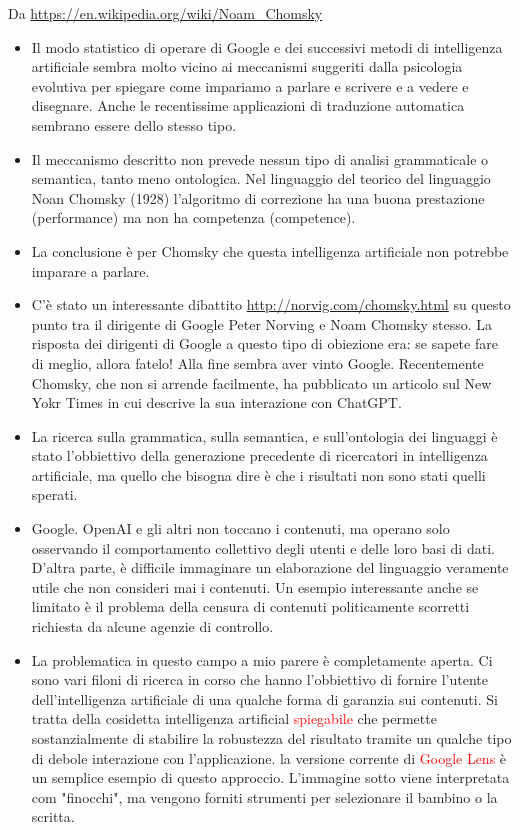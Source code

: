 \documentclass[xcolor=svgnames]{beamer}
\newcommand{\rosso}[1]{\textcolor{red}{#1}}
\renewcommand{\emph}{\rosso}
\begin{document}
\begin{frame}
  {\tiny Da \url{https://en.wikipedia.org/wiki/Noam_Chomsky}}
  
\begin{itemize}
    \item Il modo statistico di operare di Google e dei successivi metodi di intelligenza artificiale sembra molto vicino ai meccanismi suggeriti dalla psicologia evolutiva per spiegare come impariamo a parlare e scrivere e a vedere e disegnare. Anche le recentissime applicazioni di traduzione automatica sembrano essere dello stesso tipo.
    
\item Il meccanismo descritto non prevede nessun tipo di analisi grammaticale o semantica, tanto meno ontologica. Nel linguaggio del teorico del linguaggio Noan Chomsky (1928) l'algoritmo di correzione ha una buona prestazione (performance) ma non ha competenza (competence).

\item La conclusione è per Chomsky che questa intelligenza artificiale non potrebbe imparare a parlare. 

\item C'è stato un interessante dibattito {\tiny \url{http://norvig.com/chomsky.html}} su questo punto tra il dirigente di Google Peter Norving e Noam Chomsky stesso. La risposta dei dirigenti di Google a questo tipo di obiezione era: se sapete fare di meglio, allora fatelo! Alla fine sembra aver vinto Google. Recentemente Chomsky, che non si arrende facilmente, ha pubblicato un articolo sul New Yokr Times in cui descrive la sua interazione con ChatGPT.

\item La ricerca sulla grammatica, sulla semantica, e sull'ontologia dei linguaggi è stato l'obbiettivo della generazione precedente di ricercatori in intelligenza artificiale, ma quello che bisogna dire è che i risultati non sono stati quelli sperati.

\item Google. OpenAI e gli altri  non toccano i contenuti, ma operano solo osservando il comportamento collettivo degli utenti e delle loro basi di dati. D'altra parte, è difficile immaginare un elaborazione del linguaggio veramente utile che non consideri mai i contenuti. Un esempio interessante anche se limitato è il problema della censura di contenuti politicamente scorretti  richiesta da alcune agenzie di controllo.

\item La problematica in questo campo a mio parere è completamente aperta. Ci sono vari filoni di ricerca in corso che hanno l'obbiettivo di fornire l'utente dell'intelligenza artificiale di una qualche forma di garanzia sui contenuti. Si tratta della cosidetta intelligenza artificial \emph{spiegabile} che permette sostanzialmente di stabilire la robustezza del risultato tramite un qualche tipo di debole interazione con l'applicazione. la versione corrente di \emph{Google Lens} è un semplice esempio di questo approccio. L'immagine sotto viene interpretata com "finocchi", ma vengono forniti strumenti per selezionare il bambino o la scritta.
\end{itemize}


\end{frame}
\end{document}
